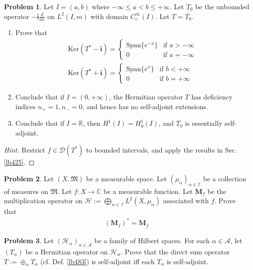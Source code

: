 \documentclass[12pt,b5paper,notitlepage]{article}
\theoremstyle{definition}
\newtheorem{prob}{\color{red}Problem}[section]
\theoremstyle{plain}
\newcommand{\fk}{\mathfrak}
\newcommand{\ovl}{\overline}
\newcommand{\Dom}{\mathscr{D}}
\newcommand{\Span}{\mathrm{Span}}
\newcommand{\scr}{\mathscr}
\newcommand{\im}{\mathbf{i}}
\newcommand{\Cbb}{\mathbb C}
\newcommand{\Rbb}{\mathbb R}
\newcommand{\Ker}{\mathrm{Ker}}
\newcommand{\MH}{\mathcal H}
\newcommand{\SI}{\mathscr I}
\newcommand{\SA}{\mathscr A}
\newcommand{\Mbf}{\mathbf M}
\numberwithin{equation}{section}
\begin{document}
\begin{prob}
Let $I=(a,b)$ where $-\infty\leq a<b\leq+\infty$. Let $T_0$ be the unbounded operator $-\im\frac d{dx}$ on $L^2(I,m)$ with domain $C_c^\infty(I)$. Let $T=\ovl {T_0}$.
\begin{enumerate}
\item Prove that 
\begin{gather*}
\Ker(T^*-\im)=\left\{\begin{array}{ll}
\Span\{e^{-x}\}&\text{if }a>-\infty\\[0.5ex]
0&\text{if }a=-\infty
\end{array}
\right.\\[0.5ex]
\Ker(T^*+\im)=\left\{\begin{array}{ll}
\Span\{e^{x}\}&\text{if }b<+\infty\\[0.5ex]
0&\text{if }b=+\infty
\end{array}
\right.
\end{gather*}
\item Conclude that if $I=(0,+\infty)$, the Hermitian operator $T$ has deficiency indices $n_+=1,n_-=0$, and hence has no self-adjoint extensions.
\item Conclude that if $I=\Rbb$, then $H^1(I)=H^1_0(I)$, and $T_0$ is essentially self-adjoint.
\end{enumerate}
\end{prob}

\begin{proof}[Hint]
Restrict $f\in\Dom(T^*)$ to bounded intervals, and apply the results in Sec. \ref{lb425}.
\end{proof}


\begin{prob}
Let $(X,\fk M)$ be a measurable space. Let $(\mu_\alpha)_{\alpha\in\SI}$ be a collection of measures on $\fk M$. Let $f:X\rightarrow\Cbb$ be a measurable function. Let $\Mbf_f$ be the multiplication operator on $\MH:=\bigoplus_{\alpha\in\SI}L^2(X,\mu_\alpha)$ associated with $f$. Prove that
\begin{align*}
(\Mbf_f)^*=\Mbf_{\ovl f}
\end{align*} 
\end{prob}


\begin{prob}\label{lb484}
Let $(\MH_\alpha)_{\alpha\in\SA}$ be a family of Hilbert spaces. For each $\alpha\in\scr A$, let $(T_\alpha)$ be a Hermitian operator on $\MH_\alpha$. Prove that the direct sum operator $T:=\oplus_\alpha T_\alpha$ (cf. Def. \ref{lb483}) is self-adjoint iff each $T_\alpha$ is self-adjoint.
\end{prob}
\end{document}
